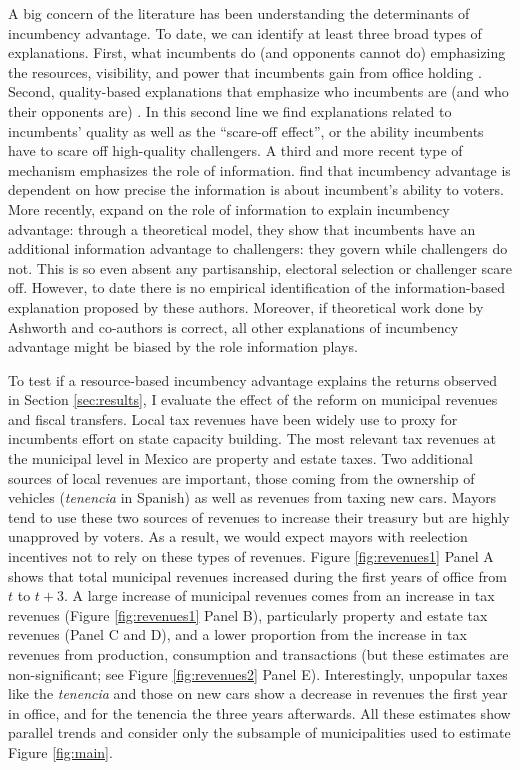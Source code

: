 \documentclass[12pt]{amsart}
\numberwithin{equation}{section}
\theoremstyle{definition}
\theoremstyle{definition}
\theoremstyle{definition}
\begin{document}
A big concern of the literature has been understanding the determinants of incumbency advantage. To date, we can identify at least three broad types of explanations. First, what incumbents do (and opponents cannot do) emphasizing the resources, visibility, and power that incumbents gain from office holding \citep{mayhew_1974, fiorina_1989, king_1991, cox_morgensten_1993}.  Second, quality-based explanations that emphasize who incumbents are (and who their opponents are) \citep{cox_katz_1996, levitt_wolfram_1997, ansolabehere_snyder_2000, eggers_2017}. In this second line we find explanations related to incumbents’ quality as well as the “scare-off effect”, or the ability incumbents have to scare off high-quality challengers. A third and more recent type of mechanism emphasizes the role of information. \citet{ashworth_bdm_2008} find that incumbency advantage is dependent on how precise the information is about incumbent’s ability to voters. More recently, \citet{ashworth_etal_2019} expand on the role of information to explain incumbency advantage: through a theoretical model, they show that incumbents have an additional information advantage to challengers: they govern while challengers do not. This is so even absent any partisanship, electoral selection or challenger scare off. However, to date there is no empirical identification of the information-based explanation proposed by these authors. Moreover, if theoretical work done by Ashworth and co-authors is correct, all other explanations of incumbency advantage might be biased by the role information plays. 

To test if a resource-based incumbency advantage explains the returns observed in Section \ref{sec:results}, I evaluate the effect of the reform on municipal revenues and fiscal transfers. Local tax revenues have been widely use to proxy for incumbents effort on state capacity building. The most relevant tax revenues at the municipal level in Mexico are property and estate taxes. Two additional sources of local revenues are important, those coming from the ownership of vehicles (\emph{tenencia} in Spanish) as well as revenues from taxing new cars. Mayors tend to use these two sources of revenues to increase their treasury but are highly unapproved by voters. As a result, we would expect mayors with reelection incentives not to rely on these types of revenues. Figure \ref{fig:revenues1} Panel A shows that total municipal revenues increased during the first years of office from $t$ to $t+3$. A large increase of municipal revenues comes from an increase in tax revenues (Figure \ref{fig:revenues1} Panel B), particularly property and estate tax revenues (Panel C and D), and a lower proportion from the increase in tax revenues from production, consumption and transactions (but these estimates are non-significant; see Figure \ref{fig:revenues2} Panel E). Interestingly, unpopular taxes like the \emph{tenencia} and those on new cars show a decrease in revenues the first year in office, and for the tenencia the three years afterwards. All these estimates show parallel trends and consider only the subsample of municipalities used to estimate Figure \ref{fig:main}. 
  
\end{document}
